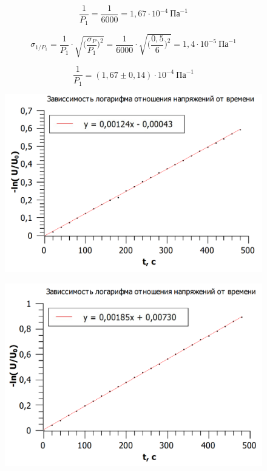 \documentclass[11pt]{article}
\begin{document}
\[\frac{1}{P_1} = \frac{1}{6000} = 1,67 \cdot 10^{-4} \: \textit{Па}^{-1}\]

\[\sigma_{1/P_1} = \frac{1}{P_1} \cdot \sqrt{\Big( \frac{\sigma_P}{P_1} \Big)^2} = \frac{1}{6000} \cdot \sqrt{\Big( \frac{0,5}{6} \Big)^2} = 1,4 \cdot 10^{-5} \:  \textit{Па}^{-1}\]

\[\frac{1}{P_1} = (1,67 \pm 0,14) \cdot  10^{-4} \: \textit{Па}^{-1}\]

\begin{figure}[h!]
\centering
\includegraphics[scale=0.6]{1graph.png}
\label{fig:Image1}
\end{figure}

\begin{figure}[h!]
\centering
\includegraphics[scale=0.6]{2graph.png}
\label{fig:Image1}
\end{figure}
\end{document}
